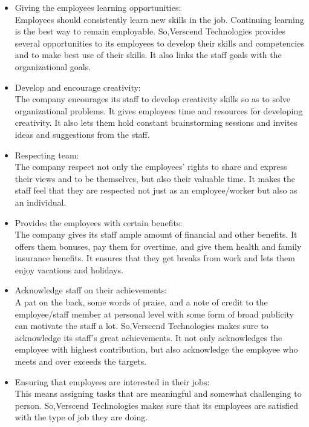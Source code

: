 \begin{itemize}
\item  Giving the employees learning opportunities:\\ Employees should consistently learn new skills in the
job. Continuing learning is the best way to remain employable. So,Verscend Technologies
provides several opportunities to its employees to develop their skills and competencies and to make
best use of their skills. It also links the staff goals with the organizational goals.
\item  Develop and encourage creativity: \\ The company encourages its staff to develop creativity skills so
as to solve organizational problems. It gives employees time and resources for developing creativity.
It also lets them hold constant brainstorming sessions and invites ideas and suggestions from the staff.
\item  Respecting team: \\ The company respect not only the employees’ rights to share and express their
views and to be themselves, but also their valuable time. It makes the staff feel that they are respected
not just as an employee/worker but also as an individual.
\item  Provides the employees with certain benefits: \\ The company gives its staff ample amount of financial
and other benefits. It offers them bonuses, pay them for overtime,
and give them health and family insurance benefits. It ensures that they get breaks from work and lets
them enjoy vacations and holidays.
\item  Acknowledge staff on their achievements: \\ A pat on the back, some words of praise, and a note of
credit to the employee/staff member at personal level with some form of broad publicity can motivate
the staff a lot. So,Verscend Technologies makes sure to acknowledge its staff's great
achievements. It not only acknowledges the employee with highest contribution, but also acknowledge
the employee who meets and over exceeds the targets.
\item  Ensuring that employees are interested in their jobs: \\ This means assigning tasks that are
meaningful and somewhat challenging to person. So,Verscend Technologies makes sure
that its employees are satisfied with the type of job they are doing.
\end{itemize}
\cleardoublepage
\item

